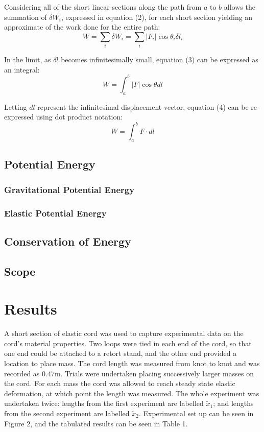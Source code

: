\documentclass[a4paper]{article}
\begin{document}
Considering all of the short linear sections along the path from $a$ to $b$ allows the summation of $\delta W_i$, expressed in equation (2), for each short section yielding an approximate of the work done for the entire path:
\begin{equation}
W = \sum_{i} \delta W_i = \sum_{i} |F_i| \cos\theta_i \delta l_i
\end{equation}

In the limit, as $\delta l$ becomes infinitesimally small, equation (3) can be expressed as an integral:
\begin{equation}
W = \int_{a}^{b} |F| \cos\theta dl
\end{equation}

Letting $dl$ represent the infinitesimal displacement vector, equation (4) can be re-expressed using dot product notation:
\begin{equation}
W = \int_{a}^{b} F \cdot dl
\end{equation}
 
\subsection{Potential Energy}

\subsubsection{Gravitational Potential Energy}

\subsubsection{Elastic Potential Energy}

\subsection{Conservation of Energy}

\subsection{Scope}

\section{Results}
A short section of elastic cord was used to capture experimental data on the cord's material properties. Two loops were tied in each end of the cord, so that one end could be attached to a retort stand, and the other end provided a location to place mass. The cord length was measured from knot to knot and was recorded as $0.47\si{\meter}$. Trials were undertaken placing successively larger masses on the cord. For each mass the cord was allowed to reach steady state elastic deformation, at which point the length was measured. The whole experiment was undertaken twice: lengths from the first experiment are labelled $\tilde{x}_1$; and lengths from the second experiment are labelled $\tilde{x}_2$. Experimental set up can be seen in Figure 2, and the tabulated results can be seen in Table 1.
\end{document}
